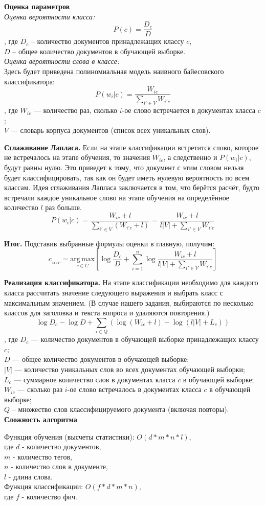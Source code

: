\textbf{Оценка параметров} \\
\textit{Оценка вероятности класса:}
$$ P(c) = \frac{D_c}{D} $$
, где $D_c$ – количество документов принадлежащих классу $c$, \\
$D$ – общее количество документов в обучающей выборке. \\
\textit{Оценка вероятности слова в классе:} \\
Здесь будет приведена полиномиальная модель наивного байесовского классификатора:
$$ P(w_i|c) = \frac{W_{ic}}{\sum_{i' \in V} W_{i'c}} $$
, где $W_{ic}$ — количество раз, сколько $i$-ое слово встречается в документах класса $c$; \\
$V$ — словарь корпуса документов (список всех уникальных слов).

\textbf{Сглаживание Лапласа.} Если на этапе классификации встретится слово, которое не встречалось на этапе обучения, то значения $W_{ic}$, а следственно и $P(w_i|c)$, будут равны нулю. Это приведет к тому, что документ с этим словом нельзя будет классифицировать, так как он будет иметь нулевую вероятность по всем классам. Идея сглаживания Лапласа заключается в том, что берётся расчёт, будто встречали каждое уникальное слово на этапе обучения на определённое количество $l$ раз больше.
$$ P(w_i|c) = \frac{W_{ic} + l}{\sum_{i' \in V} \left(W_{i'c} + l\right)} = \frac{W_{ic} + l}{l\left|V\right| + \sum_{i' \in V} W_{i'c}} $$

\textbf{Итог.} Подставив выбранные формулы оценки в главную, получим:
$$ c_{_{MAP}} = \underset{c \in C}{\mathrm{arg\,max}} \left[\log \frac{D_c}{D} + \sum^n_{i=1}\log \frac{W_{ic} + l}{l\left|V\right| + \sum_{i' \in V} W_{i'c}} \right] $$

\textbf{Реализация классификатора.} На этапе классификации необходимо для каждого класса рассчитать значение следующего выражения и выбрать класс с максимальным значением. (В случае нашего задания, выбираются по несколько классов для заголовка и текста вопроса и удаляются повторения.)
$$ \log D_c - \log D + \sum_{i \in Q}\left( \log\left(W_{ic} + l\right) - \log\left(l\left|V\right| + L_c \right) \right) $$
, где $D_c$ — количество документов в обучающей выборке принадлежащих классу $c$; \\
$D$ — общее количество документов в обучающей выборке; \\
$|V|$ — количество уникальных слов во всех документах обучающей выборки; \\
$L_{c}$ — суммарное количество слов в документах класса $c$ в обучающей выборке; \\
$W_{ic}$ — сколько раз $i$-ое слово встречалось в документах класса $c$ в обучающей выборке; \\
$Q$ – множество слов классифицируемого документа (включая повторы). \\

\textbf{Сложность алгоритма}

Функция обучения (высчеты статистики): $ O(d*m*n*l) $, \\
где $d$ - количество документов, \\
$m$ - количество тегов, \\
$n$ - количество слов в документе, \\
$l$ - длина слова. \\

Функция классификации: $ O(f*d*m*n) $, \\
где $f$ - количество фич.


\pagebreak